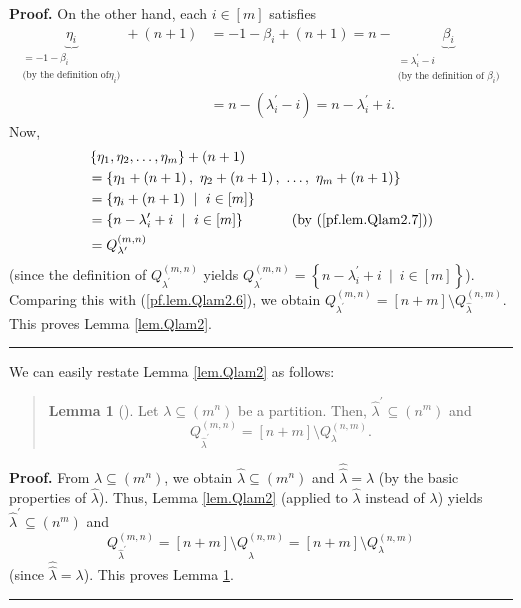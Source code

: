 \documentclass[numbers=enddot,12pt,final,onecolumn,notitlepage]{scrartcl}%
\newenvironment{statement}{\begin{quote}}{\end{quote}}
\theoremstyle{definition}
\newtheorem{lem}[theo]{Lemma}
\newenvironment{lemmain}[1][]
{\begin{statement}\begin{lem}[#1]}
{\end{lem}\end{statement}}
\newenvironment{proof}[1][Proof]{\noindent\textbf{#1.} }{\ \rule{0.5em}{0.5em}}
\newenvironment{lemmain}[1][Proof]{\noindent\textbf{#1.} }{\ \rule{0.5em}{0.5em}}
\begin{document}
\begin{enumerate}
\begin{proof}
On the other hand, each $i\in\left[  m\right]  $ satisfies%
\begin{align}
\underbrace{\eta_{i}}_{\substack{=-1-\beta_{i}\\\text{(by the definition of
}\eta_{i}\text{)}}}+\left(  n+1\right)   &  =-1-\beta_{i}+\left(  n+1\right)
=n-\underbrace{\beta_{i}}_{\substack{=\lambda_{i}^{\prime}-i\\\text{(by the
definition of }\beta_{i}\text{)}}}\nonumber\\
&  =n-\left(  \lambda_{i}^{\prime}-i\right)  =n-\lambda_{i}^{\prime}+i.
\label{pf.lem.Qlam2.7}%
\end{align}
Now,%
\begin{align*}
&  \left\{  \eta_{1},\eta_{2},\ldots,\eta_{m}\right\}  +\left(  n+1\right) \\
&  =\left\{  \eta_{1}+\left(  n+1\right)  ,\ \eta_{2}+\left(  n+1\right)
,\ \ldots,\ \eta_{m}+\left(  n+1\right)  \right\} \\
&  =\left\{  \eta_{i}+\left(  n+1\right)  \ \mid\ i\in\left[  m\right]
\right\} \\
&  =\left\{  n-\lambda_{i}^{\prime}+i\ \mid\ i\in\left[  m\right]  \right\}
\ \ \ \ \ \ \ \ \ \ \left(  \text{by (\ref{pf.lem.Qlam2.7})}\right) \\
&  =Q_{\lambda^{\prime}}^{\left(  m,n\right)  }%
\end{align*}
(since the definition of $Q_{\lambda^{\prime}}^{\left(  m,n\right)  }$ yields
$Q_{\lambda^{\prime}}^{\left(  m,n\right)  }=\left\{  n-\lambda_{i}^{\prime
}+i\ \mid\ i\in\left[  m\right]  \right\}  $). Comparing this with
(\ref{pf.lem.Qlam2.6}), we obtain $Q_{\lambda^{\prime}}^{\left(  m,n\right)
}=\left[  n+m\right]  \setminus Q_{\widehat{\lambda}}^{\left(  n,m\right)  }$.
This proves Lemma \ref{lem.Qlam2}.
\end{proof}

We can easily restate Lemma \ref{lem.Qlam2} as follows:

\begin{lemmain}
\label{lem.Qlam3}Let $\lambda\subseteq\left(  m^{n}\right)  $ be a partition.
Then, $\widehat{\lambda}^{\prime}\subseteq\left(  n^{m}\right)  $ and
\[
Q_{\widehat{\lambda}^{\prime}}^{\left(  m,n\right)  }=\left[  n+m\right]
\setminus Q_{\lambda}^{\left(  n,m\right)  }.
\]

\end{lemmain}

\begin{proof}
From $\lambda\subseteq\left(  m^{n}\right)  $, we obtain $\widehat{\lambda
}\subseteq\left(  m^{n}\right)  $ and $\widehat{\widehat{\lambda}}=\lambda$
(by the basic properties of $\widehat{\lambda}$). Thus, Lemma \ref{lem.Qlam2}
(applied to $\widehat{\lambda}$ instead of $\lambda$) yields $\widehat{\lambda
}^{\prime}\subseteq\left(  n^{m}\right)  $ and
\[
Q_{\widehat{\lambda}^{\prime}}^{\left(  m,n\right)  }=\left[  n+m\right]
\setminus Q_{\widehat{\widehat{\lambda}}}^{\left(  n,m\right)  }=\left[
n+m\right]  \setminus Q_{\lambda}^{\left(  n,m\right)  }%
\]
(since $\widehat{\widehat{\lambda}}=\lambda$). This proves Lemma
\ref{lem.Qlam3}.
\end{proof}


\end{enumerate}
\end{document}
